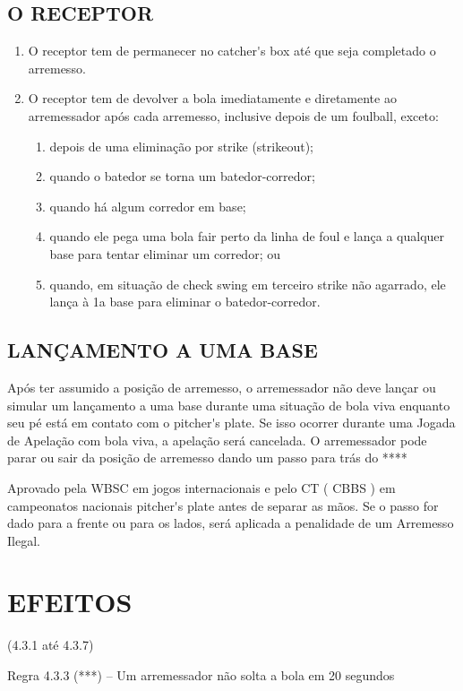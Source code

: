 \subsection{O RECEPTOR}
\begin{enumerate}[label=(\alph*)]\item   O receptor tem de permanecer no \gls{catcher's box} até que seja completado o arremesso.
\item  O receptor tem de devolver a bola imediatamente e diretamente ao arremessador após cada arremesso, inclusive depois de um \gls{foulball}, exceto:
	 \begin{enumerate}[label=\roman*.]
	\item depois de uma eliminação por \gls{strike} (\gls{strikeout});
	\item quando o batedor se torna um batedor-corredor;
	\item quando há algum corredor em base;
	\item quando ele pega uma bola \gls{fair} perto da linha de \gls{foul} e lança a qualquer base para tentar eliminar um corredor; ou
	\item quando, em situação de \gls{check swing} em terceiro \gls{strike} não agarrado, ele lança à 1a base para eliminar o batedor-corredor.
\end{enumerate}
\end{enumerate}
\subsection{LANÇAMENTO A UMA BASE}
 Após ter assumido a posição de arremesso, o arremessador não deve lançar ou simular um lançamento a uma base durante uma situação de bola viva enquanto seu pé está em contato com o \gls{pitcher's plate}. Se isso ocorrer durante uma Jogada de Apelação com bola viva, a apelação será cancelada. O arremessador pode parar ou sair da posição de arremesso dando um passo para trás do  ****

  Aprovado pela WBSC em jogos internacionais e pelo CT ( CBBS ) em campeonatos nacionais \gls{pitcher's plate} antes de separar as mãos. Se o passo for dado para a frente ou  para os lados, será aplicada a penalidade de um Arremesso Ilegal.

\section*{EFEITOS}  (4.3.1 até 4.3.7)

 Regra 4.3.3 (***)  -- Um arremessador não solta a bola em 20 segundos

